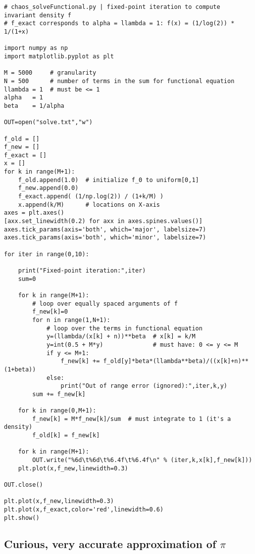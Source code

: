 \documentclass[oneside,10pt]{book}
\begin{document}
\begin{lstlisting}
# chaos_solveFunctional.py | fixed-point iteration to compute invariant density f
# f_exact corresponds to alpha = llambda = 1: f(x) = (1/log(2)) * 1/(1+x)

import numpy as np
import matplotlib.pyplot as plt

M = 5000     # granularity
N = 500      # number of terms in the sum for functional equation 
llambda = 1  # must be <= 1
alpha   = 1
beta    = 1/alpha

OUT=open("solve.txt","w")

f_old = [] 
f_new = []
f_exact = []
x = []
for k in range(M+1):
    f_old.append(1.0)  # initialize f_0 to uniform[0,1]
    f_new.append(0.0)
    f_exact.append( (1/np.log(2)) / (1+k/M) )
    x.append(k/M)      # locations on X-axis
axes = plt.axes()
[axx.set_linewidth(0.2) for axx in axes.spines.values()]
axes.tick_params(axis='both', which='major', labelsize=7)
axes.tick_params(axis='both', which='minor', labelsize=7)

for iter in range(0,10):

    print("Fixed-point iteration:",iter)
    sum=0

    for k in range(M+1): 
        # loop over equally spaced arguments of f
        f_new[k]=0
        for n in range(1,N+1):  
            # loop over the terms in functional equation 
            y=(llambda/(x[k] + n))**beta  # x[k] = k/M
            y=int(0.5 + M*y)              # must have: 0 <= y <= M
            if y <= M+1: 
                f_new[k] += f_old[y]*beta*(llambda**beta)/((x[k]+n)**(1+beta))
            else:
                print("Out of range error (ignored):",iter,k,y)
        sum += f_new[k]

    for k in range(0,M+1):
        f_new[k] = M*f_new[k]/sum  # must integrate to 1 (it's a density)
        f_old[k] = f_new[k] 
    
    for k in range(M+1): 
        OUT.write("%6d\t%6d\t%6.4f\t%6.4f\n" % (iter,k,x[k],f_new[k]))
    plt.plot(x,f_new,linewidth=0.3) 

OUT.close()

plt.plot(x,f_new,linewidth=0.3)
plt.plot(x,f_exact,color='red',linewidth=0.6)
plt.show()
\end{lstlisting}

\subsection{Curious, very accurate approximation of $\pi$}
\end{document}
